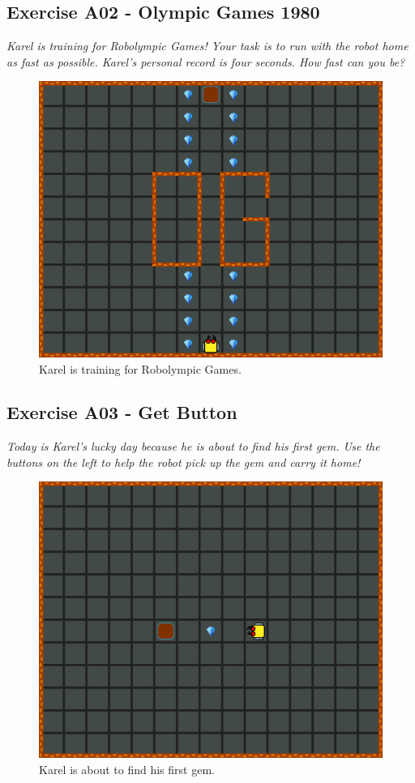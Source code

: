 \subsection{Exercise A02 - Olympic Games 1980}

{\em Karel is training for Robolympic Games! Your task is to run with 
the robot home as fast as possible. Karel's personal record is four seconds. How fast can you be?}

\begin{figure}[!ht]
\begin{center}
\includegraphics[height=0.4\textwidth]{imgk/a02.png}
\end{center}
\vspace{-4mm}
\caption{Karel is training for Robolympic Games.}
\label{fig:a02}
\vspace{-4mm}
\end{figure}
\noindent

\subsection{Exercise A03 - Get Button}

{\em Today is Karel's lucky day because he is about to find his first gem. 
Use the buttons on the left to help the robot pick up the gem and carry it 
home!}

\begin{figure}[!ht]
\begin{center}
\includegraphics[height=0.4\textwidth]{imgk/a03.png}
\end{center}
\vspace{-4mm}
\caption{Karel is about to find his first gem.}
\label{fig:a03}
\vspace{-1cm}
\end{figure}
\noindent

